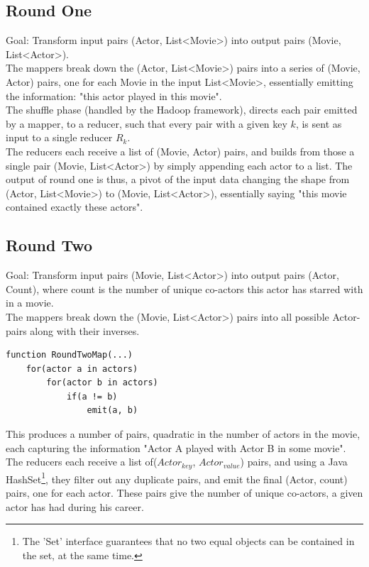 \documentclass[a4paper,11pt]{article}
\begin{document}
\subsection{Round One}
Goal: Transform input pairs (Actor, List<Movie>) into output pairs (Movie, List<Actor>).\\

The mappers break down the (Actor, List<Movie>) pairs into a series of (Movie, Actor) pairs, one for each Movie in the input List<Movie>, essentially emitting the information: "this actor played in this movie".\\

The shuffle phase (handled by the Hadoop framework), directs each pair emitted by a mapper, to a reducer, such that every pair with a given key $k$, is sent as input to a single reducer $R_k$.\\

The reducers each receive a list of (Movie, Actor) pairs, and builds from those a single pair (Movie, List<Actor>) by simply appending each actor to a list. The output of round one is thus, a pivot of the input data changing the shape from (Actor, List<Movie>) to (Movie, List<Actor>), essentially saying "this movie contained exactly these actors".

\subsection{Round Two}
\label{sub}
Goal: Transform input pairs (Movie, List<Actor>) into output pairs (Actor, Count), where count is the number of unique co-actors this actor has starred with in a movie.\\

The mappers break down the (Movie, List<Actor>) pairs into all possible Actor-pairs along with their inverses.
\begin{verbatim}
function RoundTwoMap(...)
    for(actor a in actors)
        for(actor b in actors)
            if(a != b)
                emit(a, b)
\end{verbatim}

This produces a number of pairs, quadratic in the number of actors in the movie, each capturing the information "Actor A played with Actor B in some movie".\\

The reducers each receive a list of($Actor_{key}$, $Actor_{value}$) pairs, and using a Java HashSet\footnote{The 'Set' interface guarantees that no two equal objects can be contained in the set, at the same time.}, they filter out any duplicate pairs, and emit the final (Actor, count) pairs, one for each actor. These pairs give the number of unique co-actors, a given actor has had during his career.
\end{document}
